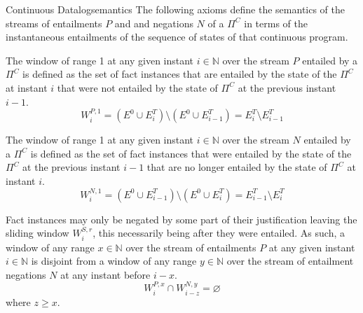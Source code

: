 \begin{nestedsection}{Continuous Datalog}{semantics}
The following axioms define the semantics of the streams of
entailments $P$ and and negations $N$ of a $\Pi^C$ in terms of the
instantaneous entailments of the sequence of states of that continuous
program.

\begin{axiom}
\label{axiom:continuous datalog: positive window increment}
The window of range 1 at any given instant ${i \in \mathbb{N}}$ over
the stream $P$ entailed by a $\Pi^C$ is defined as the set of fact instances
that are entailed by the state of the $\Pi^C$ at instant $i$ that were
not entailed by the state of $\Pi^C$ at the previous instant ${i-1}$.
\begin{equation*}
W^{P,1}_{i} = \left( E^0 \cup E^T_{i} \right) \setminus
\left( E^0 \cup E^T_{i-1} \right) = E^T_{i} \setminus E^T_{i-1}
\end{equation*}
\end{axiom}
\begin{axiom}
\label{axiom:continuous datalog: negative window increment}
The window of range 1 at any given instant ${i \in \mathbb{N}}$ over
the stream $N$ entailed by a $\Pi^C$ is defined as the set of fact instances
that were entailed by the state of the $\Pi^C$ at the previous instant
${i-1}$ that are no longer entailed by the state of $\Pi^C$ at instant $i$.
\begin{equation*}
W^{N,1}_{i} = \left( E^0 \cup E^T_{i-1} \right) \setminus
\left( E^0 \cup E^T_{i} \right) = E^T_{i-1} \setminus E^T_{i}
\end{equation*}
\end{axiom}

\begin{axiom}
\label{axiom:continuous datalog: entailment precedes negation}
Fact instances may only be negated by some part of their justification leaving
the sliding window $W^{S,r}_{i}$, this necessarily being after they
were entailed.  As such, a window of any range ${x \in \mathbb{N}}$
over the stream of entailments $P$ at any given instant ${i \in \mathbb{N}}$
is disjoint from a window of any range ${y \in \mathbb{N}}$ over the
stream of entailment negations $N$ at any instant before ${i - x}$.
\begin{equation*}
W^{P,x}_{i} \cap W^{N,y}_{i-z} = \varnothing
\end{equation*}
where $z \geq x$.
\end{axiom}


\end{nestedsection}
